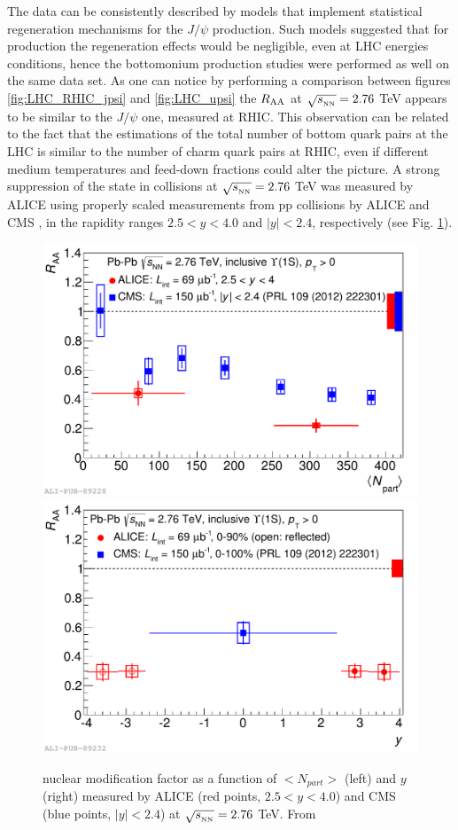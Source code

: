 The data can be consistently described by models that implement statistical regeneration mechanisms for the $J/\psi$ production.
Such models suggested that for \upsis production the regeneration effects would be negligible, even at LHC energies conditions, hence the bottomonium production studies were performed as well on the same data set.
As one can notice by performing a comparison between figures \ref{fig:LHC_RHIC_jpsi} and \ref{fig:LHC_upsi} the \upsi $R_{\rm{AA}}$ at $\sqrt{s_{_{\rm NN}}}=2.76$ TeV appears to be similar to the $J/\psi$ one, measured at RHIC.
This observation can be related to the fact that the estimations of the total number of bottom quark pairs at the LHC is similar to the number of charm quark pairs at RHIC, even if different medium temperatures and feed-down fractions could alter the picture.
A strong suppression of the \upsis state in \pbpb collisions at $\sqrt{s_{_{\rm NN}}}=2.76$ TeV was measured by ALICE using properly scaled measurements from pp collisions by ALICE \cite{Abelev:2014nua} and CMS \cite{Chatrchyan:2012lxa,Khachatryan:2016xxp}, in the rapidity ranges $2.5<y<4.0$ and $|y|<2.4$, respectively (see Fig. \ref{fig:ALICE_CMS_upsi}). 

\begin{figure}[!t]
\begin{center}
\includegraphics[width=0.47\linewidth]{Chapters/Analysis/Figs/2014-Nov-05-Raa_CMS_centr.pdf}
\includegraphics[width=0.47\linewidth]{Chapters/Analysis/Figs/2014-Nov-05-Raa_CMS_rap.pdf}
\caption{\upsis nuclear modification factor as a function of $<N_{part}>$ (left) and $y$ (right) measured by ALICE (red points, $2.5<y<4.0$) and CMS (blue points, $|y|<2.4$) at $\sqrt{s_{_{\rm NN}}}=2.76$ TeV. From \cite{Abelev:2014nua}}
\label{fig:ALICE_CMS_upsi}
\end{center}
\end{figure}

